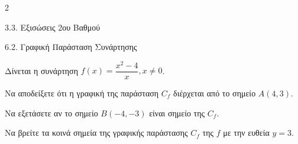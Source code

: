 \begin{ylh}{2}
    \item 3.3. Εξισώσεις 2ου Βαθμού
    \item 6.2. Γραφική Παράσταση Συνάρτησης
\end{ylh}
Δίνεται η συνάρτηση $f(x) = \dfrac{x^2-4}{x}, x \neq 0$.
\begin{alist}
\item Να αποδείξετε ότι η γραφική της παράσταση $C_f$ διέρχεται από το σημείο $A(4, 3)$.
\item Να εξετάσετε αν το σημείο $B(-4, -3)$ είναι σημείο της $C_f$.
\item Να βρείτε τα κοινά σημεία της γραφικής παράστασης $C_f$ της $f$ με την ευθεία $y = 3$.
\end{alist}

